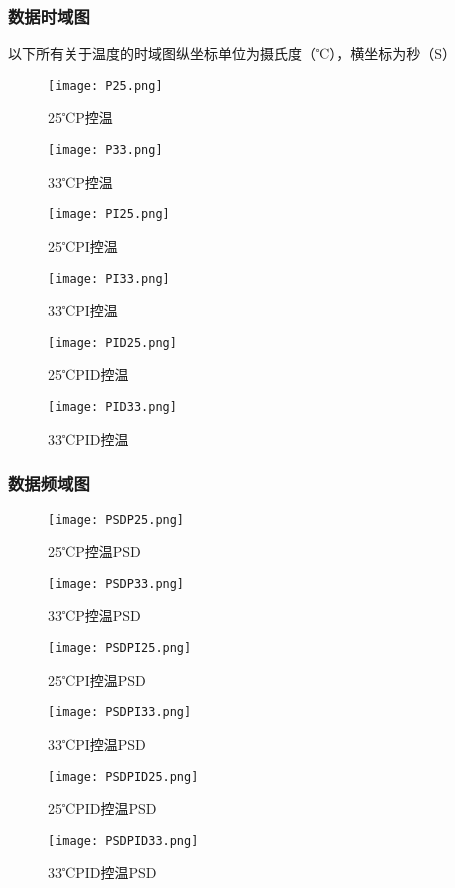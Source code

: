 \documentclass[dvipsnames, svgnames,a4paper,11pt]{article}
\begin{document}
	\subsubsection{数据时域图}
	以下所有关于温度的时域图纵坐标单位为摄氏度（℃），横坐标为秒（S）
	\begin{figure}[{H}]
		\centering
		\texttt{[image: P25.png]}
		\caption{25℃P控温}
		\label{}
	\end{figure}
	\begin{figure}[{H}]
		\centering
		\texttt{[image: P33.png]}
		\caption{33℃P控温}
		\label{}
	\end{figure}
	\begin{figure}[{H}]
		\centering
		\texttt{[image: PI25.png]}
		\caption{25℃PI控温}
		\label{}
	\end{figure}
	\begin{figure}[{H}]
		\centering
		\texttt{[image: PI33.png]}
		\caption{33℃PI控温}
		\label{}
	\end{figure}
	\begin{figure}[{H}]
		\centering
		\texttt{[image: PID25.png]}
		\caption{25℃PID控温}
		\label{}
	\end{figure}
	\begin{figure}[{H}]
		\centering
		\texttt{[image: PID33.png]}
		\caption{33℃PID控温}
		\label{}
	\end{figure}
	\subsubsection{数据频域图}
	\begin{figure}[{H}]
		\centering
		\texttt{[image: PSDP25.png]}
		\caption{25℃P控温PSD}
		\label{}
	\end{figure}
	\begin{figure}[{H}]
		\centering
		\texttt{[image: PSDP33.png]}
		\caption{33℃P控温PSD}
		\label{}
	\end{figure}
	\begin{figure}[{H}]
		\centering
		\texttt{[image: PSDPI25.png]}
		\caption{25℃PI控温PSD}
		\label{}
	\end{figure}
	\begin{figure}[{H}]
		\centering
		\texttt{[image: PSDPI33.png]}
		\caption{33℃PI控温PSD}
		\label{}
	\end{figure}
	\begin{figure}[{H}]
		\centering
		\texttt{[image: PSDPID25.png]}
		\caption{25℃PID控温PSD}
		\label{}
	\end{figure}
	\begin{figure}[{H}]
		\centering
		\texttt{[image: PSDPID33.png]}
		\caption{33℃PID控温PSD}
		\label{}
	\end{figure}
\end{document}
